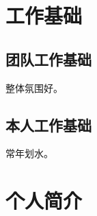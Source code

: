\chapter{工作基础}

\section{团队工作基础}

整体氛围好。

\section{本人工作基础}

常年划水。

{
\let\clearpage\relax
\let\cleardoublepage\relax

\vspace{1cm}
\chapter{个人简介}

}
